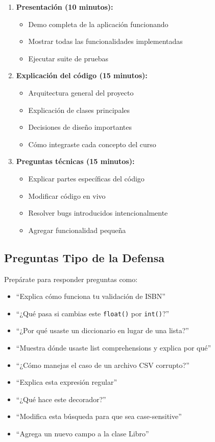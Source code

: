 \documentclass[12pt,a4paper]{article}
\begin{document}
\begin{enumerate}[leftmargin=*]
    \item \textbf{Presentación (10 minutos):}
    \begin{itemize}
        \item Demo completa de la aplicación funcionando
        \item Mostrar todas las funcionalidades implementadas
        \item Ejecutar suite de pruebas
    \end{itemize}
    
    \item \textbf{Explicación del código (15 minutos):}
    \begin{itemize}
        \item Arquitectura general del proyecto
        \item Explicación de clases principales
        \item Decisiones de diseño importantes
        \item Cómo integraste cada concepto del curso
    \end{itemize}
    
    \item \textbf{Preguntas técnicas (15 minutos):}
    \begin{itemize}
        \item Explicar partes específicas del código
        \item Modificar código en vivo
        \item Resolver bugs introducidos intencionalmente
        \item Agregar funcionalidad pequeña
    \end{itemize}
\end{enumerate}

\subsection{Preguntas Tipo de la Defensa}

Prepárate para responder preguntas como:

\begin{itemize}[leftmargin=*]
    \item ``Explica cómo funciona tu validación de ISBN''
    \item ``¿Qué pasa si cambias este \texttt{float()} por \texttt{int()}?''
    \item ``¿Por qué usaste un diccionario en lugar de una lista?''
    \item ``Muestra dónde usaste list comprehensions y explica por qué''
    \item ``¿Cómo manejas el caso de un archivo CSV corrupto?''
    \item ``Explica esta expresión regular''
    \item ``¿Qué hace este decorador?''
    \item ``Modifica esta búsqueda para que sea case-sensitive''
    \item ``Agrega un nuevo campo a la clase Libro''
\end{itemize}
\end{document}
